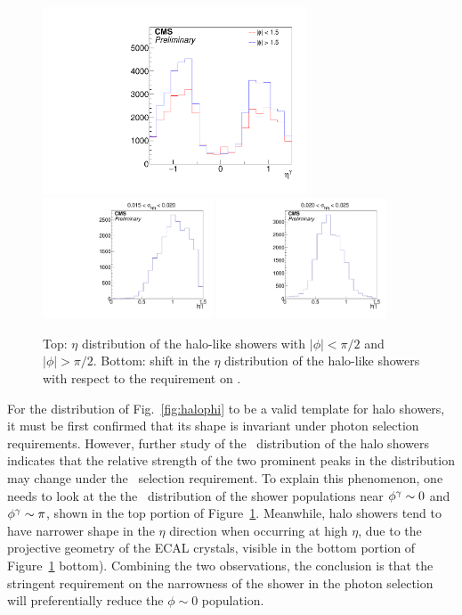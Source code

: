 \begin{figure}[tbp]
  \begin{center}
    \includegraphics[width=0.7\textwidth]{Reconstruction/Figures/halo/halo_eta.pdf}
    \includegraphics[width=0.45\textwidth]{Reconstruction/Figures/halo/halo_shape_etalow.pdf}
    \includegraphics[width=0.45\textwidth]{Reconstruction/Figures/halo/halo_shape_etahigh.pdf}
    \caption{
      Top: $\eta$ distribution of the halo-like showers with $|\phi| < \pi/2$ and $|\phi| > \pi/2$.
      Bottom: shift in the $\eta$ distribution of the halo-like showers with respect to the requirement on \sieie.
    }
    \label{fig:halo_eta}
  \end{center}
\end{figure}

For the distribution of Fig.~\ref{fig:halophi} to be a valid template for halo showers, it must be first confirmed that its shape is invariant under photon selection requirements. 
However, further study of the \phig\ distribution of the halo showers indicates that the relative strength of the two prominent peaks in the distribution may change under the \sieie\ selection requirement.  
To explain this phenomenon, one needs to look at the the \etag\ distribution of the shower populations near $\phi^{\gamma} \sim 0$ and $\phi^{\gamma} \sim \pi$, shown in the top portion of Figure~\ref{fig:halo_eta}. 
Meanwhile, halo showers tend to have narrower shape in the $\eta$ direction when occurring at high $\eta$, due to the projective geometry of the ECAL crystals, visible in the bottom portion of Figure~\ref{fig:halo_eta} bottom). 
Combining the two observations, the conclusion is that the stringent requirement on the narrowness of the shower in the photon selection will preferentially reduce the $\phi \sim 0$ population.

